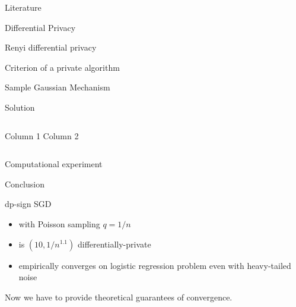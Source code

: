 \documentclass{beamer}
\begin{document}
\begin{frame}{Literature}
\end{frame}
\begin{frame}{Differential Privacy}
\end{frame}
\begin{frame}{Renyi differential privacy}
\end{frame}
\begin{frame}{Criterion of a private algorithm}
\end{frame}
\begin{frame}{Sample Gaussian Mechanism}
\end{frame}
\begin{frame}{Solution}
\begin{columns}[c]
    Column 1
    Column 2
\end{columns}
\end{frame}
\begin{frame}{Computational experiment}
\end{frame}
\begin{frame}{Conclusion}
    \begin{block}{dp-sign SGD}
    \begin{itemize}
        \item with Poisson sampling $q = 1/n$ 
        \item is $(10, 1/n^{1.1})$ differentially-private
        \item empirically converges on logistic regression problem even with heavy-tailed noise
    \end{itemize}
    \end{block}
    Now we have to provide theoretical guarantees of convergence.
\end{frame}
\end{document}
